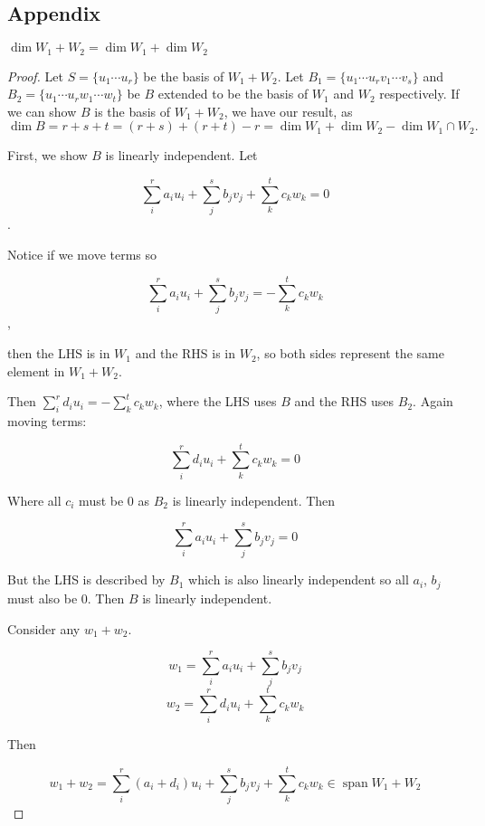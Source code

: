 \documentclass[10pt]{article}
\begin{document}
\subsection{Appendix}

\begin{theorem}
	$\dim W_1 + W_2 = \dim W_1 + \dim W_2$
\end{theorem}

\begin{proof}
	Let $S = \{ u_1 \cdots u_r \}$ be the basis of $W_1 + W_2$. Let $B_1 = \{ u_1 \cdots u_r v_1 \cdots v_s \}$ and $B_2 = \{ u_1 \cdots u_r w_1 \cdots w_t \}$ be $B$ extended to be the basis of $W_1$ and $W_2$ respectively. 
	If we can show $B$ is the basis of $W_1 + W_2$, we have our result, as $\dim B = r + s + t = (r + s) + (r + t) - r = \dim W_1 + \dim W_2 - \dim W_1 \cap W_2.$

	First, we show $B$ is linearly independent. Let 

	\[\sum_i^r{a_iu_i} + \sum_j^s{b_jv_j} + \sum_k^t{c_kw_k} = 0\]. 

	Notice if we move terms so 

	\[\sum_i^r{a_iu_i} + \sum_j^s{b_jv_j} = -\sum_k^t{c_kw_k}\], 

	then the LHS is in $W_1$ and the RHS is in $W_2$, so both sides represent the same element in $W_1 + W_2$. 

	Then $\sum_i^r{d_iu_i} = -\sum_k^t{c_kw_k}$, where the LHS uses $B$ and the RHS uses $B_2$. Again moving terms:

	\[\sum_i^r{d_iu_i} + \sum_k^t{c_kw_k} = 0\]

	Where all $c_i$ must be 0 as $B_2$ is linearly independent. Then

	\[\sum_i^r{a_iu_i} + \sum_j^s{b_jv_j} = 0\]

	But the LHS is described by $B_1$ which is also linearly independent so all $a_i$, $b_j$ must also be 0. Then $B$ is linearly independent.

	Consider any $w_1 + w_2$. 

	\[w_1 = \sum_i^r{a_iu_i} + \sum_j^s{b_jv_j}\]
	\[w_2 = \sum_i^r{d_iu_i} + \sum_k^t{c_kw_k}\]

	Then

	\[w_1 + w_2 = \sum_i^r{(a_i + d_i) u_i} + \sum_j^s{b_jv_j} + \sum_k^t{c_kw_k} \in \operatorname{span} W_1 + W_2 \]

\end{proof}
\end{document}
